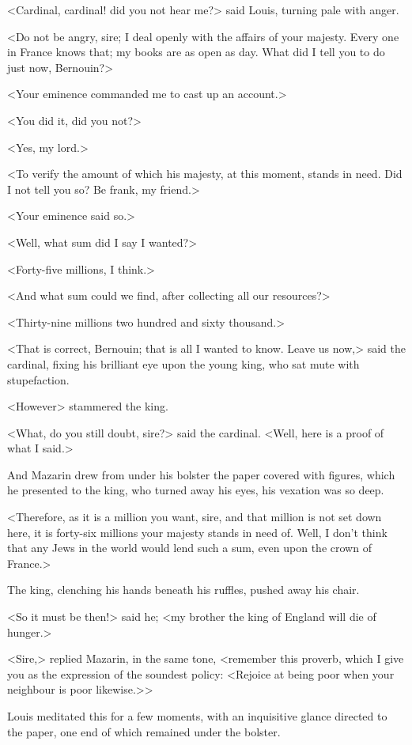 <Cardinal, cardinal! did you not hear me?> said Louis, turning pale with anger.

<Do not be angry, sire; I deal openly with the affairs of your majesty. Every one in France knows that; my books are as open as day. What did I tell you to do just now, Bernouin?>

<Your eminence commanded me to cast up an account.>

<You did it, did you not?>

<Yes, my lord.>

<To verify the amount of which his majesty, at this moment, stands in need. Did I not tell you so? Be frank, my friend.>

<Your eminence said so.>

<Well, what sum did I say I wanted?>

<Forty-five millions, I think.>

<And what sum could we find, after collecting all our resources?>

<Thirty-nine millions two hundred and sixty thousand.>

<That is correct, Bernouin; that is all I wanted to know. Leave us now,> said the cardinal, fixing his brilliant eye upon the young king, who sat mute with stupefaction.

<However\longdash> stammered the king.

<What, do you still doubt, sire?> said the cardinal. <Well, here is a proof of what I said.>

And Mazarin drew from under his bolster the paper covered with figures, which he presented to the king, who turned away his eyes, his vexation was so deep.

<Therefore, as it is a million you want, sire, and that million is not set down here, it is forty-six millions your majesty stands in need of. Well, I don't think that any Jews in the world would lend such a sum, even upon the crown of France.>

The king, clenching his hands beneath his ruffles, pushed away his chair.

<So it must be then!> said he; <my brother the king of England will die of hunger.>

<Sire,> replied Mazarin, in the same tone, <remember this proverb, which I give you as the expression of the soundest policy: <Rejoice at being poor when your neighbour is poor likewise.>>

Louis meditated this for a few moments, with an inquisitive glance directed to the paper, one end of which remained under the bolster.


